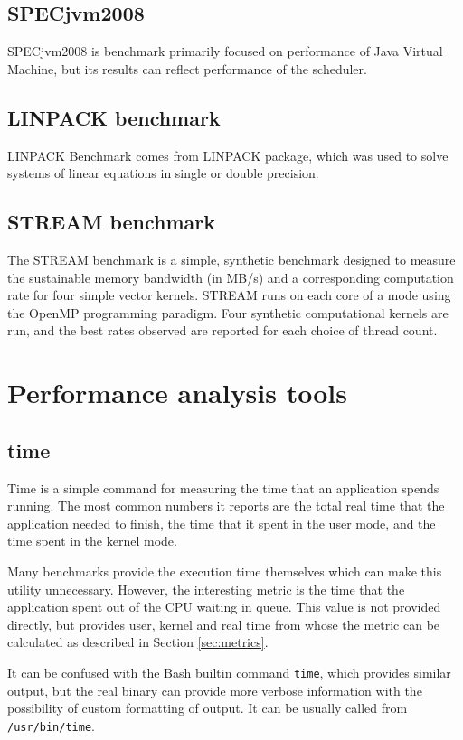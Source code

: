 \subsection{SPECjvm2008}
SPECjvm2008 is benchmark primarily focused on performance of Java Virtual
Machine, but its results can reflect performance of the scheduler.

\subsection{LINPACK benchmark}
LINPACK Benchmark\cite{linpack} comes from LINPACK package, which was used to solve systems of linear equations in single or double precision.

\subsection{STREAM benchmark}
The STREAM benchmark is a simple, synthetic benchmark designed to measure the sustainable memory bandwidth (in MB/s) and a corresponding computation rate for four simple vector kernels.
STREAM runs on each core of a mode using the OpenMP programming paradigm. Four synthetic computational kernels are run, and the best rates observed are reported for each choice of thread count.

\section{Performance analysis tools}

\subsection{time}
Time is a simple command for measuring the time that an application spends
running. The most common numbers it reports are the total real time that the
application needed to finish, the time that it spent in the user mode, and the
time spent in the kernel mode.

Many benchmarks provide the execution time themselves which can make this
utility unnecessary. However, the interesting metric is the time that the
application spent out of the CPU waiting in queue. This value is not provided
directly, but provides user, kernel and real time from whose the metric can be
calculated as described in Section \ref{sec:metrics}.

It can be confused with the Bash builtin command \texttt{time}, which provides similar
output, but the real binary can provide more verbose information with
the possibility of custom formatting of output. It can be usually called from
\texttt{/usr/bin/time}.

